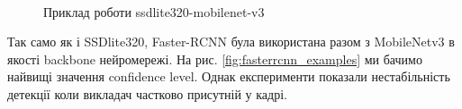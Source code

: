 \begin{figure}[H]
    \centering
     \\
    \caption{Приклад роботи ssdlite320-mobilenet-v3
        \label{fig:ssdlite320_mobilenet-v3_examples}
    }
\end{figure}

Так само як і SSDlite320, Faster-RCNN була використана разом з MobileNetv3 в якості backbone нейромережі.
На рис. \ref{fig:fasterrcnn_examples} ми бачимо найвищі значення confidence level. Однак експерименти
показали нестабільність детекції коли викладач частково присутній у кадрі.

